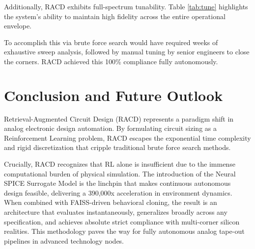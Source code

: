 \documentclass[11pt, a4paper]{article}
\begin{document}
Additionally, RACD exhibits full-spectrum tunability. Table \ref{tab:tune} highlights the system's ability to maintain high fidelity across the entire operational envelope.

\begin{table}[!htbp]
\centering
\caption{Wide-Range Tunability Verification (Targeting 4.0 dB -- 12.0 dB)}
\label{tab:tune}
\end{table}

To accomplish this via brute force search would have required weeks of exhaustive sweep analysis, followed by manual tuning by senior engineers to close the corners. RACD achieved this 100\% compliance fully autonomously.

\section{Conclusion and Future Outlook}
Retrieval-Augmented Circuit Design (RACD) represents a paradigm shift in analog electronic design automation. By formulating circuit sizing as a Reinforcement Learning problem, RACD escapes the exponential time complexity and rigid discretization that cripple traditional brute force search methods. 

Crucially, RACD recognizes that RL alone is insufficient due to the immense computational burden of physical simulation. The introduction of the Neural SPICE Surrogate Model is the linchpin that makes continuous autonomous design feasible, delivering a 390,000x acceleration in environment dynamics. When combined with FAISS-driven behavioral cloning, the result is an architecture that evaluates instantaneously, generalizes broadly across any specification, and achieves absolute strict compliance with multi-corner silicon realities. This methodology paves the way for fully autonomous analog tape-out pipelines in advanced technology nodes.
\end{document}
